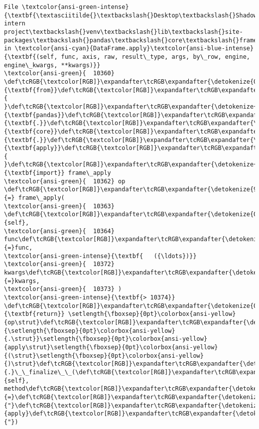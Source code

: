 \documentclass[11pt]{article}
\begin{document}
\begin{Verbatim}[commandchars=\\\{\}, frame=single, framerule=2mm, rulecolor=\color{outerrorbackground}]
File \textcolor{ansi-green-intense}{\textbf{\textasciitilde{}\textbackslash{}Desktop\textbackslash{}Shadowfox intern project\textbackslash{}venv\textbackslash{}lib\textbackslash{}site-packages\textbackslash{}pandas\textbackslash{}core\textbackslash{}frame.py:10374}}, in \textcolor{ansi-cyan}{DataFrame.apply}\textcolor{ansi-blue-intense}{\textbf{(self, func, axis, raw, result\_type, args, by\_row, engine, engine\_kwargs, **kwargs)}}
\textcolor{ansi-green}{  10360} \def\tcRGB{\textcolor[RGB]}\expandafter\tcRGB\expandafter{\detokenize{0,135,0}}{\textbf{from}}\def\tcRGB{\textcolor[RGB]}\expandafter\tcRGB\expandafter{\detokenize{188,188,188}}{ }\def\tcRGB{\textcolor[RGB]}\expandafter\tcRGB\expandafter{\detokenize{0,0,255}}{\textbf{pandas}}\def\tcRGB{\textcolor[RGB]}\expandafter\tcRGB\expandafter{\detokenize{0,0,255}}{\textbf{.}}\def\tcRGB{\textcolor[RGB]}\expandafter\tcRGB\expandafter{\detokenize{0,0,255}}{\textbf{core}}\def\tcRGB{\textcolor[RGB]}\expandafter\tcRGB\expandafter{\detokenize{0,0,255}}{\textbf{.}}\def\tcRGB{\textcolor[RGB]}\expandafter\tcRGB\expandafter{\detokenize{0,0,255}}{\textbf{apply}}\def\tcRGB{\textcolor[RGB]}\expandafter\tcRGB\expandafter{\detokenize{188,188,188}}{ }\def\tcRGB{\textcolor[RGB]}\expandafter\tcRGB\expandafter{\detokenize{0,135,0}}{\textbf{import}} frame\_apply
\textcolor{ansi-green}{  10362} op \def\tcRGB{\textcolor[RGB]}\expandafter\tcRGB\expandafter{\detokenize{98,98,98}}{=} frame\_apply(
\textcolor{ansi-green}{  10363}     \def\tcRGB{\textcolor[RGB]}\expandafter\tcRGB\expandafter{\detokenize{0,135,0}}{self},
\textcolor{ansi-green}{  10364}     func\def\tcRGB{\textcolor[RGB]}\expandafter\tcRGB\expandafter{\detokenize{98,98,98}}{=}func,
\textcolor{ansi-green-intense}{\textbf{   ({\ldots})}}
\textcolor{ansi-green}{  10372}     kwargs\def\tcRGB{\textcolor[RGB]}\expandafter\tcRGB\expandafter{\detokenize{98,98,98}}{=}kwargs,
\textcolor{ansi-green}{  10373} )
\textcolor{ansi-green-intense}{\textbf{> 10374}} \def\tcRGB{\textcolor[RGB]}\expandafter\tcRGB\expandafter{\detokenize{0,135,0}}{\textbf{return}} \setlength{\fboxsep}{0pt}\colorbox{ansi-yellow}{op\strut}\def\tcRGB{\textcolor[RGB]}\expandafter\tcRGB\expandafter{\detokenize{98,98,98}}{\setlength{\fboxsep}{0pt}\colorbox{ansi-yellow}{.\strut}}\setlength{\fboxsep}{0pt}\colorbox{ansi-yellow}{apply\strut}\setlength{\fboxsep}{0pt}\colorbox{ansi-yellow}{(\strut}\setlength{\fboxsep}{0pt}\colorbox{ansi-yellow}{)\strut}\def\tcRGB{\textcolor[RGB]}\expandafter\tcRGB\expandafter{\detokenize{98,98,98}}{.}\_\_finalize\_\_(\def\tcRGB{\textcolor[RGB]}\expandafter\tcRGB\expandafter{\detokenize{0,135,0}}{self}, method\def\tcRGB{\textcolor[RGB]}\expandafter\tcRGB\expandafter{\detokenize{98,98,98}}{=}\def\tcRGB{\textcolor[RGB]}\expandafter\tcRGB\expandafter{\detokenize{175,0,0}}{"}\def\tcRGB{\textcolor[RGB]}\expandafter\tcRGB\expandafter{\detokenize{175,0,0}}{apply}\def\tcRGB{\textcolor[RGB]}\expandafter\tcRGB\expandafter{\detokenize{175,0,0}}{"})


\end{Verbatim}
\end{document}
